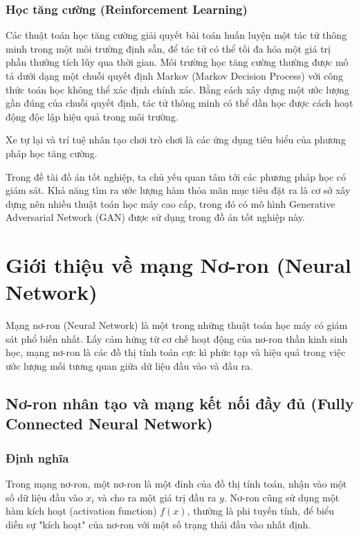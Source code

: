\documentclass[12pt]{extreport}
\begin{document}
\subsubsection{Học tăng cường (Reinforcement Learning)}

Các thuật toán học tăng cường giải quyết bài toán huấn luyện một tác tử thông minh trong một môi trường định sẵn, để tác tử có thể tối đa hóa một giá trị phần thưởng tích lũy qua thời gian. Môi trường học tăng cường thường được mô tả dưới dạng một chuỗi quyết định Markov (Markov Decision Process) với công thức toán học không thể xác định chính xác. Bằng cách xây dựng một ước lượng gần đúng của chuỗi quyết định, tác tử thông minh có thể dần học được cách hoạt động độc lập hiệu quả trong môi trường.

Xe tự lại và trí tuệ nhân tạo chơi trò chơi là các ứng dụng tiêu biểu của phương pháp học tăng cường.

Trong đề tài đồ án tốt nghiệp, ta chủ yếu quan tâm tới các phương pháp học có giám sát. Khả năng tìm ra ước lượng hàm thỏa mãn mục tiêu đặt ra là cơ sở xây dựng nên nhiều thuật toán học máy cao cấp, trong đó có mô hình Generative Adversarial Network (GAN) được sử dụng trong đồ án tốt nghiệp này.

\section{Giới thiệu về mạng Nơ-ron (Neural Network)}

Mạng nơ-ron (Neural Network) là một trong những thuật toán học máy có giám sát phổ biến nhất. Lấy cảm hứng từ cơ chế hoạt động của nơ-ron thần kinh sinh học, mạng nơ-ron là các đồ thị tính toán cực kì phức tạp và hiệu quả trong việc ước lượng mối tương quan giữa dữ liệu đầu vào và đầu ra.

\subsection{Nơ-ron nhân tạo và mạng kết nối đầy đủ (Fully Connected Neural Network)}

\subsubsection{Định nghĩa}

Trong mạng nơ-ron, một nơ-ron là một đỉnh của đồ thị tính toán, nhận vào một số dữ liệu đầu vào $ x_i $ và cho ra một giá trị đầu ra $ y $. Nơ-ron cũng sử dụng một hàm kích hoạt (activation function) $ f(x) $, thường là phi tuyến tính, để biểu diễn sự "kích hoạt" của nơ-ron với một số trạng thái đầu vào nhất định.
\end{document}

